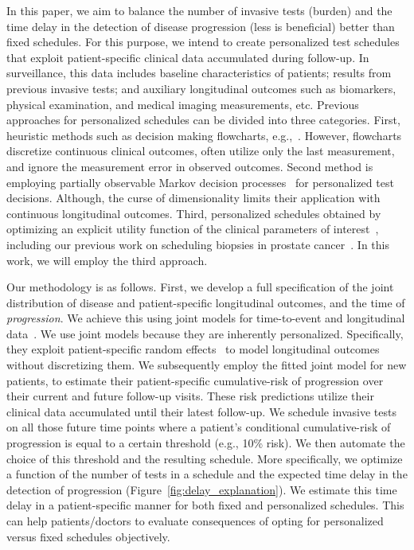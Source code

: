 In this paper, we aim to balance the number of invasive tests (burden) and the time delay in the detection of disease progression (less is beneficial) better than fixed schedules. For this purpose, we intend to create personalized test schedules that exploit patient-specific clinical data accumulated during follow-up. In surveillance, this data includes baseline characteristics of patients; results from previous invasive tests; and auxiliary longitudinal outcomes such as biomarkers, physical examination, and medical imaging measurements, etc. Previous approaches for personalized schedules can be divided into three categories. First, heuristic methods such as decision making flowcharts, e.g.,~\citet{bokhorst2015compliance}. However, flowcharts discretize continuous clinical outcomes, often utilize only the last measurement, and ignore the measurement error in observed outcomes. Second method is employing partially observable Markov decision processes~\citep{alagoz2010operations, steimle2017markov} for personalized test decisions. Although, the curse of dimensionality limits their application with continuous longitudinal outcomes. Third, personalized schedules obtained by optimizing an explicit utility function of the clinical parameters of interest~\citep{bebu2017optimal,rizopoulos2015personalized}, including our previous work on scheduling biopsies in prostate cancer~\citep{tomer2019personalized}. In this work, we will employ the third approach.

Our methodology is as follows. First, we develop a full specification of the joint distribution of disease and patient-specific longitudinal outcomes, and the time of \textit{progression}. We achieve this using joint models for time-to-event and longitudinal data~\citep{tsiatis2004joint,rizopoulos2012joint}. We use joint models because they are inherently personalized. Specifically, they exploit patient-specific random effects~\citep{laird1982random} to model longitudinal outcomes without discretizing them. We subsequently employ the fitted joint model for new patients, to estimate their patient-specific cumulative-risk of progression over their current and future follow-up visits. These risk predictions utilize their clinical data accumulated until their latest follow-up. We schedule invasive tests on all those future time points where a patient's conditional cumulative-risk of progression is equal to a certain threshold (e.g., 10\% risk). We then automate the choice of this threshold and the resulting schedule. More specifically, we optimize a function of the number of tests in a schedule and the expected time delay in the detection of progression (Figure~\ref{fig:delay_explanation}). We estimate this time delay in a patient-specific manner for both fixed and personalized schedules. This can help patients/doctors to evaluate consequences of opting for personalized versus fixed schedules objectively.


